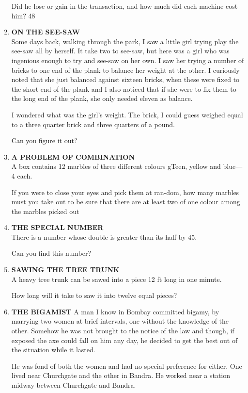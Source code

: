 \documentclass[12pt]{article}
\begin{document}
\begin{enumerate}
Did he lose  or gain  in the transaction,  and  how  much did each  machine  cost  him? 
48 
%
\item \textbf{ON THE  SEE-SAW} \\
Some  days  back,  walking  through  the  park,  I saw  a little  girl  trying  play  the see-saw  all by herself.  It take two to see-saw,  but  here  was  a girl  who  was ingenious enough  to try and see-saw  on her own. I saw  her trying  a number  of bricks  to one end of the plank  to balance  her weight  at the other. I curiously  noted  that  she just balanced  against  sixteen bricks,  when  these  were  fixed  to the short  end of the plank and I also  noticed  that  if she were  to fix them  to the  long end of the plank,  she only  needed  eleven  as balance. 

I wondered  what  was  the  girl's  weight.  The  brick, I could  guess  weighed  equal  to a three  quarter  brick  and three  quarters  of a pound. 

Can you figure  it out? 
%
\item \textbf{A  PROBLEM  OF  COMBINATION} \\ 
A box  contains  12 marbles  of three  different  colours gTeen,  yellow  and blue—4  each. 

If you  were  to close  your  eyes  and pick  them  at ran-dom,  how  many  marbles  must  you  take  out to be sure that there  are  at least  two  of one  colour  among  the marbles  picked  out 
%
\item \textbf{THE  SPECIAL  NUMBER} \\ 
There  is a number  whose  double  is greater  than  its half by 45. 

Can you  find  this number? 
%
\item \textbf{SAWING  THE  TREE  TRUNK} \\
A heavy  tree  trunk  can  be sawed  into  a piece  12 ft long in one minute.

How  long  will it take  to saw it into  twelve equal  pieces? 
%
\item \textbf{THE  BIGAMIST} 
A man  I know  in Bombay  committed  bigamy,  by marrying two women  at brief  intervals,  one without  the knowledge of the  other.  Somehow  he was  not  brought  to the notice  of the law and  though,  if exposed  the axe could fall on him  any day,  he decided  to get the best  out of the situation  while  it lasted. 

He was  fond  of both  the  women  and had no special preference  for either.  One  lived  near  Churchgate  and the other  in Bandra.  He  worked  near  a station  midway between  Churchgate  and Bandra. 


\end{enumerate}
\end{document}
